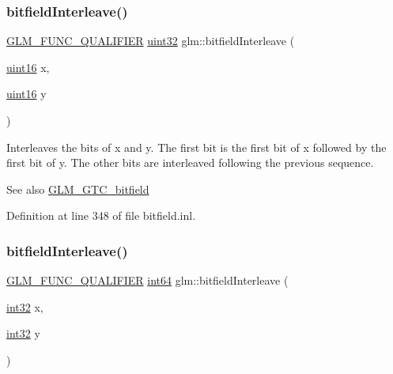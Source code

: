 \subsubsection{\texorpdfstring{bitfieldInterleave()}{bitfieldInterleave()}\hspace{0.1cm}{\footnotesize\ttfamily [4/16]}}
{\footnotesize\ttfamily \mbox{\hyperlink{setup_8hpp_a33fdea6f91c5f834105f7415e2a64407}{G\+L\+M\+\_\+\+F\+U\+N\+C\+\_\+\+Q\+U\+A\+L\+I\+F\+I\+ER}} \mbox{\hyperlink{group__gtc__type__precision_ga202b6a53c105fcb7e531f9b443518451}{uint32}} glm\+::bitfield\+Interleave (\begin{DoxyParamCaption}\item[{\mbox{\hyperlink{group__gtc__type__precision_gad8c2939e1fdd8e5828b31d95c52255d5}{uint16}}}]{x,  }\item[{\mbox{\hyperlink{group__gtc__type__precision_gad8c2939e1fdd8e5828b31d95c52255d5}{uint16}}}]{y }\end{DoxyParamCaption})}

Interleaves the bits of x and y. The first bit is the first bit of x followed by the first bit of y. The other bits are interleaved following the previous sequence.

\begin{DoxySeeAlso}{See also}
\mbox{\hyperlink{group__gtc__bitfield}{G\+L\+M\+\_\+\+G\+T\+C\+\_\+bitfield}} 
\end{DoxySeeAlso}


Definition at line 348 of file bitfield.\+inl.

\mbox{\label{group__gtc__bitfield_ga0de51d5985e6a703f305a5a61479babd}} 
\subsubsection{\texorpdfstring{bitfieldInterleave()}{bitfieldInterleave()}\hspace{0.1cm}{\footnotesize\ttfamily [5/16]}}
{\footnotesize\ttfamily \mbox{\hyperlink{setup_8hpp_a33fdea6f91c5f834105f7415e2a64407}{G\+L\+M\+\_\+\+F\+U\+N\+C\+\_\+\+Q\+U\+A\+L\+I\+F\+I\+ER}} \mbox{\hyperlink{group__gtc__type__precision_ga435d75819cce297cc5fa21bd84ef89a5}{int64}} glm\+::bitfield\+Interleave (\begin{DoxyParamCaption}\item[{\mbox{\hyperlink{group__gtc__type__precision_ga632d8b25f6b61659f39ea4321fab92a4}{int32}}}]{x,  }\item[{\mbox{\hyperlink{group__gtc__type__precision_ga632d8b25f6b61659f39ea4321fab92a4}{int32}}}]{y }\end{DoxyParamCaption})}

